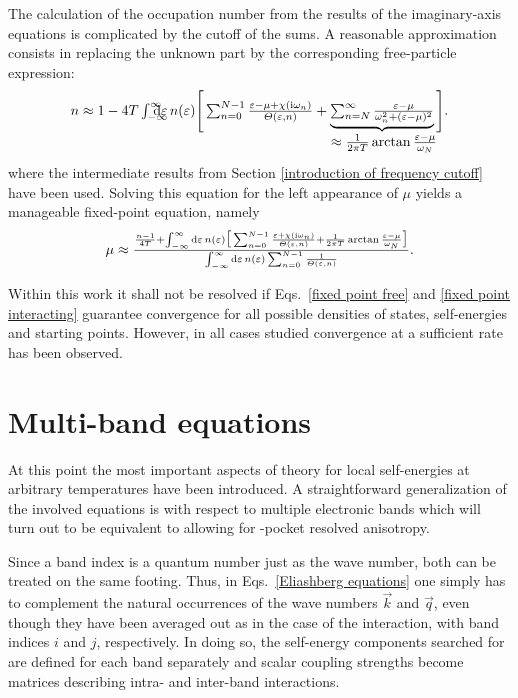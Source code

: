 The calculation of the occupation number from the results of the imaginary-axis
 equations is complicated by the cutoff of the 
sums. A reasonable approximation consists in replacing the unknown part by the
corresponding free-particle expression:
%
\begin{equation*}
    n \approx 1 - 4 T \int \from{-\infty} \till \infty \D \epsilon \,
    n(\epsilon)
    \Bigg[
        \sum_{n = 0}^{N - 1}
        \frac{\epsilon - \mu + \chi(\I \omega_n)}{\Theta(\epsilon, n)}
        + \hypo { \sum_{n = N}^\infty
            \frac{\epsilon - \mu}{\omega_n^2 + (\epsilon - \mu)^2} }
            {\approx \frac 1 {2 \pi T} \arctan \frac{\epsilon - \mu}{\omega_N}}
    \Bigg].
\end{equation*}
%
where the intermediate results from Section \ref{introduction of frequency
cutoff} have been used. Solving this equation for the left appearance of $\mu$
yields a manageable fixed-point equation, namely
%
\begin{equation} \label{fixed point interacting}
    \mu \approx \frac
    {
        \frac{n - 1}{4 T} + \int_{-\infty}^\infty \D \epsilon \, n(\epsilon)
        \big[
            \sum_{n = 0}^{N - 1}
            \frac{\epsilon + \chi(\I \omega_n)}{\Theta(\epsilon, n)}
            + \frac 1 {2 \pi T} \arctan \frac{\epsilon - \mu}{\omega_N}
        \big]
    }
    {
        \int_{-\infty}^\infty \D \epsilon \, n(\epsilon)
        \sum_{n = 0}^{N - 1} \frac 1 {\Theta(\epsilon, n)}
    }.
\end{equation}

Within this work it shall not be resolved if Eqs.~\ref{fixed point free} and
\ref{fixed point interacting} guarantee convergence for all possible densities
of states, self-energies and starting points. However, in all cases studied
convergence at a sufficient rate has been observed.

\section{Multi-band equations}
\label{multi-band equations}

At this point the most important aspects of  theory for local
self-energies at arbitrary temperatures have been introduced. A straightforward
generalization of the involved equations is with respect to multiple electronic
bands which will turn out to be equivalent to allowing for -pocket
resolved anisotropy.

Since a band index is a quantum number just as the wave number, both can be
treated on the same footing. Thus, in Eqs.~\ref{Eliashberg equations} one simply
has to complement the natural occurrences of the wave numbers $\vec k$ and $\vec
q$, even though they have been averaged out as in the case of the 
interaction, with band indices $i$ and $j$, respectively. In doing so, the
self-energy components searched for are defined for each band separately and
scalar coupling strengths become matrices describing intra- and inter-band
interactions.

